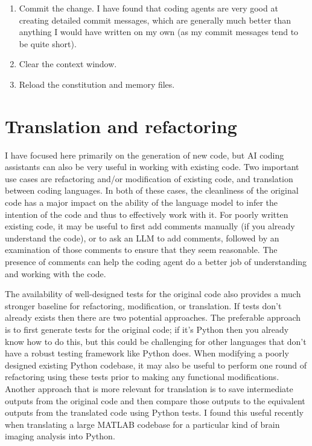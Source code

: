 \begin{enumerate}[resume]
\item Commit the change. I have found that coding agents are very good at creating detailed commit messages, which are generally much better than anything I would have written on my own (as my commit messages tend to be quite short).
\item Clear the context window.
\item Reload the constitution and memory files.
\end{enumerate}

\section{Translation and refactoring}

I have focused here primarily on the generation of new code, but AI coding assistants can also be very useful in working with existing code.  Two important use cases are refactoring and/or modification of existing code, and translation between coding languages. In both of these cases, the cleanliness of the original code has a major impact on the ability of the language model to infer the intention of the code and thus to effectively work with it.  For poorly written existing code, it may be useful to first add comments manually (if you already understand the code), or to ask an LLM to add comments, followed by an examination of those comments to ensure that they seem reasonable.  The presence of comments can help the coding agent do a better job of understanding and working with the code.

The availability of well-designed tests for the original code also provides a much stronger baseline for refactoring, modification, or translation.  If tests don't already exists then there are two potential approaches.  The preferable approach is to first generate tests for the original code; if it's Python then you already know how to do this, but this could be challenging for other languages that don't have a robust testing framework like Python does.  When modifying a poorly designed existing Python codebase, it may also be useful to perform one round of refactoring using these tests prior to making any functional modifications.  Another approach that is more relevant for translation is to save intermediate outputs from the original code and then compare those outputs to the equivalent outputs from the translated code using Python tests.  I found this useful recently when translating a large MATLAB codebase for a particular kind of brain imaging analysis into Python.

